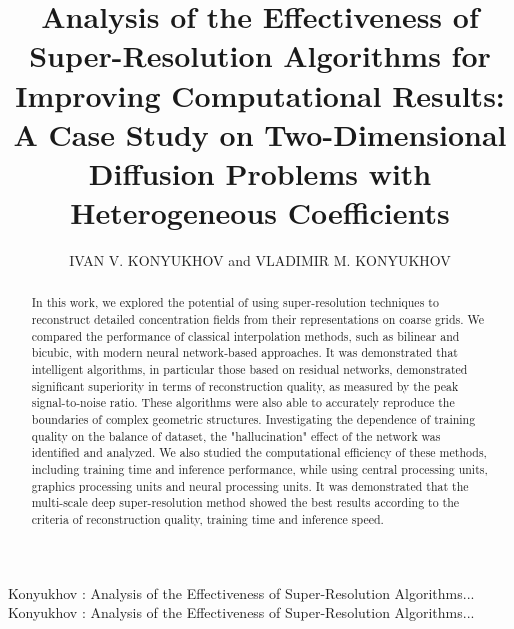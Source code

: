 \documentclass{ieeeaccess}
\begin{document}

\title{Analysis of the Effectiveness of Super-Resolution Algorithms for Improving Computational Results: A Case Study on Two-Dimensional Diffusion Problems with Heterogeneous Coefficients}
\author{\uppercase{Ivan V. Konyukhov}
and \uppercase{Vladimir M. Konyukhov}}
\address[1]{Research Center of the Artificial Intelligence Institute, Innopolis University, Innopolis, 420500 Russia (e-mail: i.konyukhov@innopolis.ru)}
\address[2]{Research Center of the Artificial Intelligence Institute, Innopolis University, Innopolis, 420500 Russia (e-mail: v.konuhov.r@innopolis.ru)}

\markboth
{Konyukhov \headeretal: Analysis of the Effectiveness of Super-Resolution Algorithms...}
{Konyukhov \headeretal: Analysis of the Effectiveness of Super-Resolution Algorithms...}


\begin{abstract}
In this work, we explored the potential of using super-resolution techniques to reconstruct detailed concentration fields from their representations on coarse grids. We compared the performance of classical interpolation methods, such as bilinear and bicubic, with modern neural network-based approaches. It was demonstrated that intelligent algorithms, in particular those based on residual networks, demonstrated significant superiority in terms of reconstruction quality, as measured by the peak signal-to-noise ratio. These algorithms were also able to accurately reproduce the boundaries of complex geometric structures. Investigating the dependence of training quality on the balance of dataset,  the "hallucination" effect of the network was identified and analyzed. We also studied the computational efficiency of these methods, including training time and inference performance, while using central processing units, graphics processing units and neural processing units. It was demonstrated that the multi-scale deep super-resolution method showed the best results according to the criteria of reconstruction quality, training time and inference speed.
\end{abstract}
\end{document}
